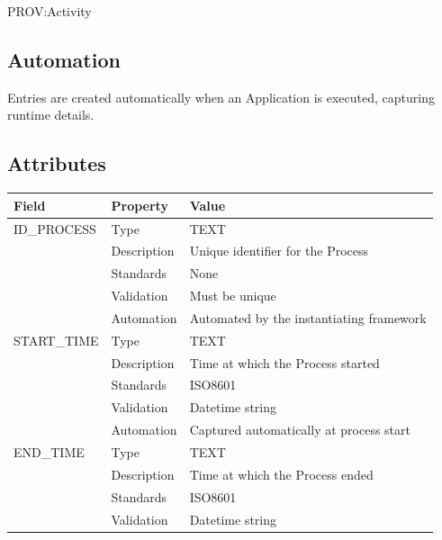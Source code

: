 PROV:Activity

\subsection{Automation}\label{automation-25}

Entries are created automatically when an Application is executed,
capturing runtime details.

\subsection{Attributes}\label{attributes-22}

\begin{longtable}[]{@{}
  >{\raggedright\arraybackslash}p{}
  >{\raggedright\arraybackslash}p{}
  >{\raggedright\arraybackslash}p{}@{}}
\toprule\noalign{}
\begin{minipage}[b]{\linewidth}\raggedright
Field
\end{minipage} & \begin{minipage}[b]{\linewidth}\raggedright
Property
\end{minipage} & \begin{minipage}[b]{\linewidth}\raggedright
Value
\end{minipage} \\
\midrule\noalign{}
\endhead
\bottomrule\noalign{}
\endlastfoot
ID\_PROCESS & Type & TEXT \\
& Description & Unique identifier for the Process \\
& Standards & None \\
& Validation & Must be unique \\
& Automation & Automated by the instantiating framework \\
START\_TIME & Type & TEXT \\
& Description & Time at which the Process started \\
& Standards & ISO8601 \\
& Validation & Datetime string \\
& Automation & Captured automatically at process start \\
END\_TIME & Type & TEXT \\
& Description & Time at which the Process ended \\
& Standards & ISO8601 \\
& Validation & Datetime string \\

\end{longtable}
